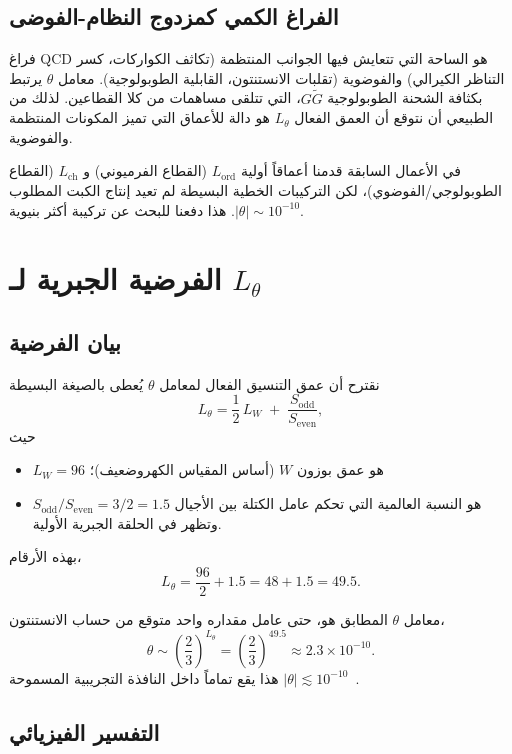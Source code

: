 \documentclass[12pt,a4paper]{article}
\begin{document}
	\subsection{الفراغ الكمي كمزدوج النظام-الفوضى}
	فراغ QCD هو الساحة التي تتعايش فيها الجوانب المنتظمة (تكاثف الكواركات، كسر التناظر الكيرالي) والفوضوية (تقلبات الانستنتون، القابلية الطوبولوجية). معامل \(\theta\) يرتبط بكثافة الشحنة الطوبولوجية \(G\widetilde{G}\)، التي تتلقى مساهمات من كلا القطاعين. لذلك من الطبيعي أن نتوقع أن العمق الفعال \(L_\theta\) هو دالة للأعماق التي تميز المكونات المنتظمة والفوضوية.
	
	في الأعمال السابقة قدمنا أعماقاً أولية \(L_{\mathrm{ord}}\) (القطاع الفرميوني) و \(L_{\mathrm{ch}}\) (القطاع الطوبولوجي/الفوضوي)، لكن التركيبات الخطية البسيطة لم تعيد إنتاج الكبت المطلوب \(|\theta| \sim 10^{-10}\). هذا دفعنا للبحث عن تركيبة أكثر بنيوية.
	
	\section{الفرضية الجبرية لـ \(L_\theta\)}
	\label{sec:hypothesis}
	
	\subsection{بيان الفرضية}
	
	نقترح أن عمق التنسيق الفعال لمعامل \(\theta\) يُعطى بالصيغة البسيطة
	\begin{equation}
		\boxed{L_\theta = \frac{1}{2}\,L_W \;+\; \frac{S_{\mathrm{odd}}}{S_{\mathrm{even}}}},
		\label{eq:Ltheta}
	\end{equation}
	حيث
	\begin{itemize}
		\item \(L_W = 96\) هو عمق بوزون \(W\) (أساس المقياس الكهروضعيف)؛
		\item \(S_{\mathrm{odd}}/S_{\mathrm{even}} = 3/2 = 1.5\) هو النسبة العالمية التي تحكم عامل الكتلة بين الأجيال وتظهر في الحلقة الجبرية الأولية.
	\end{itemize}
	
	بهذه الأرقام،
	\[
	L_\theta = \frac{96}{2} + 1.5 = 48 + 1.5 = 49.5.
	\]
	
	معامل \(\theta\) المطابق هو، حتى عامل مقداره واحد متوقع من حساب الانستنتون،
	\[
	\theta \sim \left(\frac{2}{3}\right)^{L_\theta} = \left(\frac{2}{3}\right)^{49.5} \approx 2.3 \times 10^{-10}.
	\]
	هذا يقع تماماً داخل النافذة التجريبية المسموحة \(|\theta| \lesssim 10^{-10}\)~\cite{nEDM2020}.
	
	\subsection{التفسير الفيزيائي}
	
\end{document}
